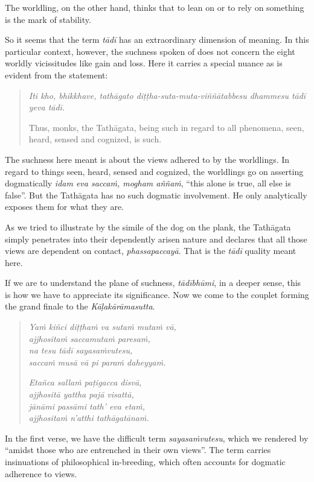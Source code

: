 The worldling, on the other hand, thinks that to lean on or to rely on something is the mark of stability.

So it seems that the term \emph{tādī} has an extraordinary dimension of meaning. In this particular context, however, the suchness spoken of does not concern the eight worldly vicissitudes like gain and loss. Here it carries a special nuance as is evident from the statement:

\begin{quote}
\emph{Iti kho, bhikkhave, tathāgato diṭṭha-suta-muta-viññātabbesu dhammesu tādī yeva tādī.}

Thus, monks, the Tathāgata, being such in regard to all phenomena, seen, heard, sensed and cognized, is such.
\end{quote}

The suchness here meant is about the views adhered to by the worldlings. In regard to things seen, heard, sensed and cognized, the worldlings go on asserting dogmatically \emph{idam eva saccaṁ, mogham aññaṁ}, ``this alone is true, all else is false''. But the Tathāgata has no such dogmatic involvement. He only analytically exposes them for what they are.

As we tried to illustrate by the simile of the dog on the plank, the Tathāgata simply penetrates into their dependently arisen nature and declares that all those views are dependent on contact, \emph{phassapaccayā}. That is the \emph{tādī} quality meant here.

If we are to understand the plane of suchness, \emph{tādībhūmi}, in a deeper sense, this is how we have to appreciate its significance. Now we come to the couplet forming the grand finale to the \emph{Kāḷakārāmasutta}.

\begin{quote}
\emph{Yaṁ kiñci diṭṭhaṁ va sutaṁ mutaṁ vā,}\\
\emph{ajjhositaṁ saccamutaṁ paresaṁ,}\\
\emph{na tesu tādī sayasaṁvutesu,}\\
\emph{saccaṁ musā vā pi paraṁ daheyyaṁ.}

\emph{Etañca sallaṁ paṭigacca disvā,}\\
\emph{ajjhositā yattha pajā visattā,}\\
\emph{jānāmi passāmi tath' eva etaṁ,}\\
\emph{ajjhositaṁ n'atthi tathāgatānaṁ.}
\end{quote}

In the first verse, we have the difficult term \emph{sayasaṁvutesu}, which we rendered by ``amidst those who are entrenched in their own views''. The term carries insinuations of philosophical in-breeding, which often accounts for dogmatic adherence to views.

